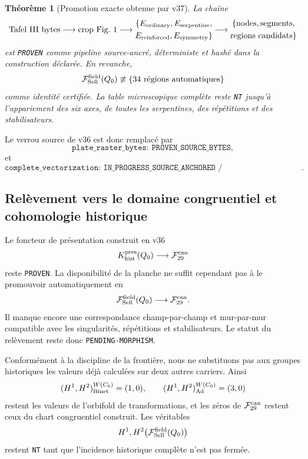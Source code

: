 \documentclass[11pt,a4paper]{article}
\newtheorem{theorem}{Théorème}[section]
\newcommand{\certProven}{\texttt{PROVEN}}
\newcommand{\certPending}{\texttt{PENDING-MORPHISM}}
\newcommand{\certNT}{\texttt{NT}}
\begin{document}
\begin{theorem}[Promotion exacte obtenue par v37]\label{thm:v37-plate-promotion}
La chaîne
\[
 \text{Tafel III bytes}
 \longrightarrow
 \text{crop Fig.~1}
 \longrightarrow
 \begin{gathered}
 \{E_{\rm ordinary},E_{\rm serpentine},\\
 E_{\rm reinforced},E_{\rm symmetry}\}
 \end{gathered}
 \longrightarrow
 \begin{gathered}
 \{\text{nodes},\text{segments},\\
 \text{regions candidats}\}
 \end{gathered}
\]
est \certProven{} comme pipeline source-ancré, déterministe et hashé dans la construction déclarée. En revanche,
\[
 \mathcal F_{\rm Sell}^{\rm field}(Q_0)
 \not\equiv
 \{34\text{ régions automatiques}
 \}
\]
comme identité certifiée. La table microscopique complète reste \certNT{} jusqu'à l'appariement des six axes, de toutes les serpentines, des répétitions et des stabilisateurs.
\end{theorem}

Le verrou source de v36 est donc remplacé par
\[
 \boxed{\texttt{plate\_raster\_bytes: PROVEN\_SOURCE\_BYTES}},
\]
et
\[
 \boxed{\texttt{complete\_vectorization:
 IN\_PROGRESS\_SOURCE\_ANCHORED / NT\_COMPLETE\_INCIDENCE}}.
\]

\subsection{Relèvement vers le domaine congruentiel et cohomologie historique}

Le foncteur de présentation construit en v36
\[
 K_{\rm hist}^{\rm pres}(Q_0)\longrightarrow\mathcal F_{29}^{\rm can}
\]
reste \certProven{}. La disponibilité de la planche ne suffit cependant pas à le promouvoir automatiquement en
\[
 \mathcal F_{\rm Sell}^{\rm field}(Q_0)
 \longrightarrow
 \mathcal F_{29}^{\rm can}.
\]
Il manque encore une correspondance champ-par-champ et mur-par-mur compatible avec les singularités, répétitions et stabilisateurs. Le statut du relèvement reste donc \certPending{}.

Conformément à la discipline de la frontière, nous ne substituons pas aux groupes historiques les valeurs déjà calculées sur deux autres carriers. Ainsi
\[
 (H^1,H^2)_{\rm Binet}^{W(C_6)}=(1,0),\qquad
 (H^1,H^2)_{\rm Ad}^{W(C_6)}=(3,0)
\]
restent les valeurs de l'orbifold de transformations, et les zéros de $\mathcal F_{29}^{\rm can}$ restent ceux du chart congruentiel construit. Les véritables
\[
 H^1,H^2\bigl(\mathcal F_{\rm Sell}^{\rm field}(Q_0)\bigr)
\]
restent \certNT{} tant que l'incidence historique complète n'est pas fermée.
\end{document}
